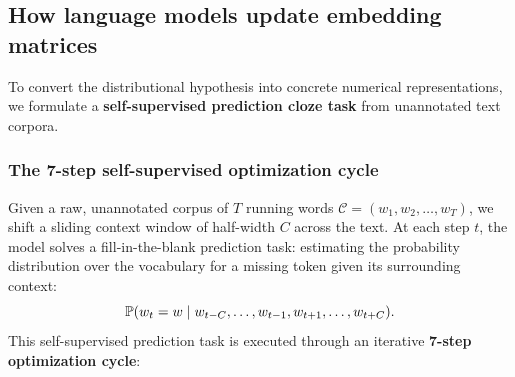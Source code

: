 \documentclass[../../../main.tex]{subfiles}
\begin{document}
\subsection{How language models update embedding matrices}
\label{sec:embedding_training_loop}

To convert the distributional hypothesis into concrete numerical representations, we formulate a \textbf{self-supervised prediction cloze task} from unannotated text corpora.

\subsubsection{The 7-step self-supervised optimization cycle}
\label{subsec:seven_step_loop}

Given a raw, unannotated corpus of $T$ running words $\mathcal{C} = (w_1, w_2, \dots, w_T)$, we shift a sliding context window of half-width $C$ across the text. At each step $t$, the model solves a fill-in-the-blank prediction task: estimating the probability distribution over the vocabulary for a missing token given its surrounding context:
\begin{equation}
\label{eq:cloze_task}
\mathbb{P}(w_t = w \mid w_{t-C}, \dots, w_{t-1}, w_{t+1}, \dots, w_{t+C}).
\end{equation}
This self-supervised prediction task is executed through an iterative \textbf{7-step optimization cycle}:
\end{document}
